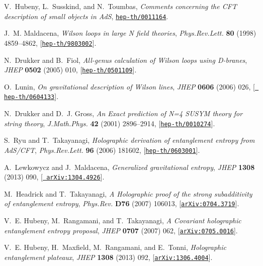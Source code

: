 \documentclass[12pt]{article}
\begin{document}
\begin{thebibliography}{100}
V.~Hubeny, L.~Susskind, and N.~Toumbas, {\it {Comments concerning the CFT
  description of small objects in AdS}},
  \href{http://xxx.lanl.gov/abs/hep-th/0011164}{{\tt hep-th/0011164}}.

J.~M. Maldacena, {\it {Wilson loops in large N field theories}},  {\em
  Phys.Rev.Lett.} {\bf 80} (1998) 4859--4862,
  [\href{http://xxx.lanl.gov/abs/hep-th/9803002}{{\tt hep-th/9803002}}].

N.~Drukker and B.~Fiol, {\it {All-genus calculation of Wilson loops using
  D-branes}},  {\em JHEP} {\bf 0502} (2005) 010,
  [\href{http://xxx.lanl.gov/abs/hep-th/0501109}{{\tt hep-th/0501109}}].

O.~Lunin, {\it {On gravitational description of Wilson lines}},  {\em JHEP}
  {\bf 0606} (2006) 026, [\href{http://xxx.lanl.gov/abs/hep-th/0604133}{{\tt
  hep-th/0604133}}].

N.~Drukker and D.~J. Gross, {\it {An Exact prediction of N=4 SUSYM theory for
  string theory}},  {\em J.Math.Phys.} {\bf 42} (2001) 2896--2914,
  [\href{http://xxx.lanl.gov/abs/hep-th/0010274}{{\tt hep-th/0010274}}].

S.~Ryu and T.~Takayanagi, {\it {Holographic derivation of entanglement entropy
  from AdS/CFT}},  {\em Phys.Rev.Lett.} {\bf 96} (2006) 181602,
  [\href{http://xxx.lanl.gov/abs/hep-th/0603001}{{\tt hep-th/0603001}}].

A.~Lewkowycz and J.~Maldacena, {\it {Generalized gravitational entropy}},  {\em
  JHEP} {\bf 1308} (2013) 090, [\href{http://xxx.lanl.gov/abs/1304.4926}{{\tt
  arXiv:1304.4926}}].

M.~Headrick and T.~Takayanagi, {\it {A Holographic proof of the strong
  subadditivity of entanglement entropy}},  {\em Phys.Rev.} {\bf D76} (2007)
  106013, [\href{http://xxx.lanl.gov/abs/0704.3719}{{\tt arXiv:0704.3719}}].

V.~E. Hubeny, M.~Rangamani, and T.~Takayanagi, {\it {A Covariant holographic
  entanglement entropy proposal}},  {\em JHEP} {\bf 0707} (2007) 062,
  [\href{http://xxx.lanl.gov/abs/0705.0016}{{\tt arXiv:0705.0016}}].

V.~E. Hubeny, H.~Maxfield, M.~Rangamani, and E.~Tonni, {\it {Holographic
  entanglement plateaux}},  {\em JHEP} {\bf 1308} (2013) 092,
  [\href{http://xxx.lanl.gov/abs/1306.4004}{{\tt arXiv:1306.4004}}].


\end{thebibliography}
\end{document}
